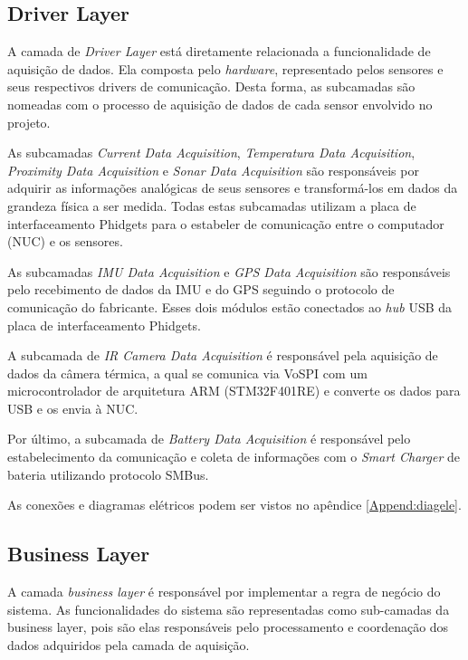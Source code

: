 \subsection{Driver Layer}
	
A camada de \textit{Driver Layer} está diretamente relacionada a funcionalidade de aquisição de dados. Ela composta pelo \textit{hardware}, representado pelos sensores e seus respectivos drivers de comunicação. Desta forma, as subcamadas são nomeadas com o processo de aquisição de dados de cada sensor envolvido no projeto.

As subcamadas \textit{Current Data Acquisition}, \textit{Temperatura Data Acquisition}, \textit{Proximity Data Acquisition} e \textit{Sonar Data Acquisition} são responsáveis por adquirir as informações analógicas de seus sensores e transformá-los em dados da grandeza física a ser medida. Todas estas subcamadas utilizam a placa de interfaceamento Phidgets para o estabeler de comunicação entre o computador (NUC) e os sensores.

As subcamadas \textit{IMU Data Acquisition} e \textit{GPS Data Acquisition} são responsáveis pelo recebimento de dados da IMU e do GPS seguindo o protocolo de comunicação do fabricante. Esses dois módulos estão conectados ao \textit{hub} USB da placa de interfaceamento Phidgets. 

A subcamada de \textit{IR Camera Data Acquisition} é responsável pela aquisição de dados da câmera térmica, a qual se comunica via VoSPI com um microcontrolador de arquitetura ARM (STM32F401RE) e converte os dados para USB e os envia à NUC. 

Por último, a subcamada de \textit{Battery Data Acquisition} é responsável pelo estabelecimento da comunicação e coleta de informações com o \textit{Smart Charger} de bateria utilizando protocolo SMBus.

As conexões e diagramas elétricos podem ser vistos no apêndice \ref{Append:diagele}.

\subsection{Business Layer}

A camada \textit{business layer} é responsável por implementar a regra de negócio do sistema. As funcionalidades do sistema são representadas como sub-camadas da business layer, pois são elas responsáveis pelo processamento e coordenação dos dados adquiridos pela camada de aquisição.

